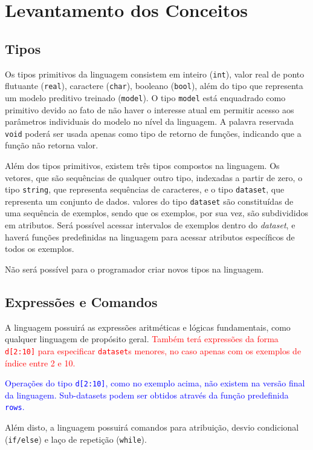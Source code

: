 \documentclass[12pt]{article}
\newcommand{\blu}{\textcolor{blue}}
\newcommand{\red}{\textcolor{red}}
\begin{document}
\color{black}
\section{Levantamento dos Conceitos}

\subsection{Tipos}

Os tipos primitivos da linguagem consistem em inteiro ({\tt int}), valor real de ponto flutuante ({\tt real}), caractere ({\tt char}), booleano ({\tt bool}), além do tipo que representa um modelo preditivo treinado ({\tt model}). O tipo {\tt model} está enquadrado como primitivo devido ao fato de não  haver o interesse atual em permitir acesso aos parâmetros individuais do modelo no nível da linguagem. A palavra reservada {\tt void} poderá ser usada apenas como tipo de retorno de funções, indicando que a função não retorna valor.

Além dos tipos primitivos, existem três tipos compostos na linguagem. Os vetores, que são sequências de qualquer outro tipo, indexadas a partir de zero, o tipo {\tt string}, que representa sequências de caracteres, e o tipo {\tt dataset}, que representa um conjunto de dados. valores do tipo {\tt dataset} são constituídas de uma sequência de exemplos, sendo que os exemplos, por sua vez, são subdivididos em atributos. Será possível acessar intervalos de exemplos dentro do {\it dataset}, e haverá funções predefinidas na linguagem para acessar atributos específicos de todos os exemplos.

Não será possível para o programador criar novos tipos na linguagem.

\subsection{Expressões e Comandos}

A linguagem possuirá as expressões aritméticas e lógicas fundamentais, como qualquer linguagem de propósito geral. \red{Também terá expressões da forma 
{\tt d[2:10]} para especificar {\tt dataset}s menores, no caso apenas com os exemplos de índice entre 2 e 10.}

\blu{Operações do tipo \texttt{d[2:10]}, como no exemplo acima, não existem na versão final da linguagem. Sub-datasets podem ser obtidos através da função predefinida \texttt{rows}.}

Além disto, a linguagem possuirá comandos para atribuição, desvio condicional ({\tt if/else}) e laço de repetição ({\tt while}).
\end{document}
